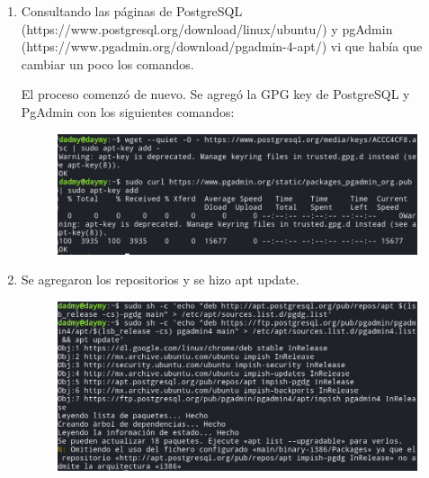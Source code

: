 \documentclass{exam}
\begin{document}
\begin{enumerate}
\item Consultando las páginas de PostgreSQL (https://www.postgresql.org/download/linux/ubuntu/) y pgAdmin (https://www.pgadmin.org/download/pgadmin-4-apt/) vi que había que cambiar un poco los comandos.

El proceso comenzó de nuevo. Se agregó la GPG key de PostgreSQL y PgAdmin con los siguientes comandos:

\begin{figure}[h]
	\centering
    \includegraphics[width = 15cm]{imgNolasco/9.png}
\end{figure}


\newpage
\item Se agregaron los repositorios y se hizo apt update.
\begin{figure}[h]
	\centering
    \includegraphics[width = 15cm]{imgNolasco/10.png}
\end{figure}



\end{enumerate}
\end{document}
